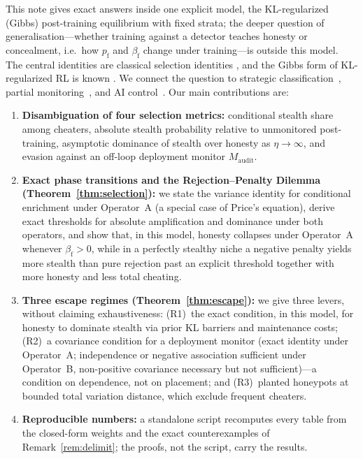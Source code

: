 \documentclass[11pt,a4paper]{article}
\begin{document}
This note gives exact answers inside one explicit model, the KL-regularized (Gibbs) post-training equilibrium with fixed strata; the deeper question of generalisation---whether training against a detector teaches honesty or concealment, i.e.\ how $p_{\mathrm{f}}$ and $\beta_{\mathrm{f}}$ change under training---is outside this model. The central identities are classical selection identities \cite{fisher1930,robertson1966,price1970}, and the Gibbs form of KL-regularized RL is known \cite{korbak2022}. We connect the question to strategic classification~\cite{hardt2016}, partial monitoring~\cite{bartok2014}, and AI control~\cite{greenblatt2023,griffin2024,terekhov2025,ukaisi2025}. Our main contributions are:
\begin{enumerate}
  \item \textbf{Disambiguation of four selection metrics:} conditional stealth share among cheaters, absolute stealth probability relative to unmonitored post-training, asymptotic dominance of stealth over honesty as $\eta \to \infty$, and evasion against an off-loop deployment monitor $M_{\mathrm{audit}}$.
  \item \textbf{Exact phase transitions and the Rejection--Penalty Dilemma (Theorem~\ref{thm:selection}):} we state the variance identity for conditional enrichment under Operator~A (a special case of Price's equation), derive exact thresholds for absolute amplification and dominance under both operators, and show that, in this model, honesty collapses under Operator~A whenever $\beta_{\mathrm{f}} > 0$, while in a perfectly stealthy niche a negative penalty yields more stealth than pure rejection past an explicit threshold together with more honesty and less total cheating.
  \item \textbf{Three escape regimes (Theorem~\ref{thm:escape}):} we give three levers, without claiming exhaustiveness: (R1)~the exact condition, in this model, for honesty to dominate stealth via prior KL barriers and maintenance costs; (R2)~a covariance condition for a deployment monitor (exact identity under Operator~A; independence or negative association sufficient under Operator~B, non-positive covariance necessary but not sufficient)---a condition on dependence, not on placement; and (R3)~planted honeypots at bounded total variation distance, which exclude frequent cheaters.
  \item \textbf{Reproducible numbers:} a standalone script recomputes every table from the closed-form weights and the exact counterexamples of Remark~\ref{rem:delimit}; the proofs, not the script, carry the results.
\end{enumerate}
\end{document}
